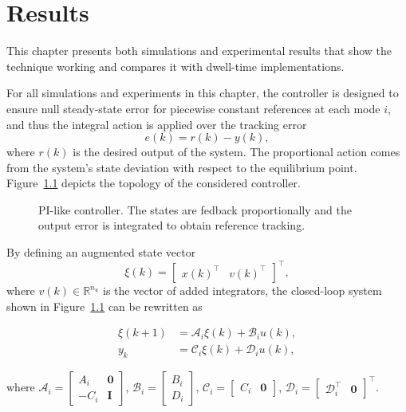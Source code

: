 
\chapter{Results}%
\label{chp:results}

This chapter presents both simulations and experimental results that show the
technique working and compares it with dwell-time implementations.

For all simulations and experiments in this chapter, the controller is designed
to ensure null steady-state error for piecewise constant references at each mode
\(i\), and thus the integral action is applied over the tracking
error~\parencite{lopes.leite.ea:anti-windup}
%
\begin{equation}
  \label{eq:r-y-error}
  e(k) = r(k)-y(k),
\end{equation}
%
where \(r(k)\) is the desired output of the system. The proportional action
comes from the system's state deviation with respect to the equilibrium point.
Figure~\ref{fig:pi-controller-diagram} depicts the topology of the considered
controller.

\begin{figure}[!htb]
  \centering
  \resizebox{0.98\linewidth}{!}{}
  \caption[PI-like controller.]{PI-like controller. The states are fedback
    proportionally and the output error is integrated to obtain reference
    tracking.}%
  \label{fig:pi-controller-diagram}
\end{figure}

By defining an augmented state vector
\[
  \xi(k)=\begin{bmatrix}{x(k)}^\top &v{(k)}^\top\end{bmatrix}^\top,
\]
where \(v(k)\in\mathbb{R}^{n_u}\) is the vector of added integrators, the
closed-loop system shown in Figure~\ref{fig:pi-controller-diagram} can be
rewritten as

\begin{equation}
  \label{eq:augmented-system}
  \begin{split}
    \xi(k+1) &= \mathcal{A}_i\xi(k)+\mathcal{B}_{i}u(k), \\
    y_{k}    &= \mathcal{C}_i\xi(k)+\mathcal{D}_{i}u(k),
  \end{split}
\end{equation}

where \(\mathcal{A}_i=\begin{bmatrix}A_i & \textbf{0} \\-C_{i}&\textbf{I}
\end{bmatrix} \), \(\mathcal{B}_i=\begin{bmatrix}B_i\\D_i\end{bmatrix}\),
\(\mathcal{C}_i=\begin{bmatrix} C_i & \textbf{0} \end{bmatrix}\),
\(\mathcal{D}_i=\begin{bmatrix}\mathcal{D}_i^\top&\textbf{0}\end{bmatrix}^\top\).


